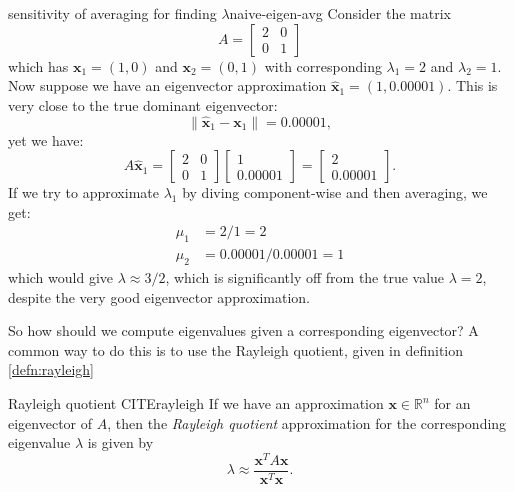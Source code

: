 \documentclass{article}
\let\vec\mathbf
\begin{document}
\begin{example}{sensitivity of averaging for finding $\lambda$}{naive-eigen-avg}
  Consider the matrix
  \begin{equation*}
    A = \begin{bmatrix}2 & 0 \\ 0 & 1\end{bmatrix}
  \end{equation*}
  which has $\vec{x}_1 = (1,0)$ and $\vec{x}_2 = (0,1)$ with corresponding $\lambda_1 = 2$ and $\lambda_2 = 1$. Now suppose we have an eigenvector approximation $\hat{\vec{x}}_1 = (1, 0.00001)$. This is very close to the true dominant eigenvector:
  \begin{equation*}
    \lVert \hat{\vec{x}}_1 - \vec{x}_1 \rVert = 0.00001,
  \end{equation*}
  yet we have:
  \begin{equation*}
    A\hat{\vec{x}}_1 = \begin{bmatrix}2 & 0 \\ 0 & 1\end{bmatrix}\begin{bmatrix}1 \\ 0.00001\end{bmatrix} = \begin{bmatrix}2 \\ 0.00001\end{bmatrix}.
  \end{equation*}
  If we try to approximate $\lambda_1$ by diving component-wise and then averaging, we get:
  \begin{align*}
    \mu_1 &= 2 / 1 = 2 \\
    \mu_2 &= 0.00001 / 0.00001 = 1
  \end{align*}
  which would give $\lambda \approx 3/2$, which is significantly off from the true value $\lambda = 2$, despite the very good eigenvector approximation.
\end{example}

So how should we compute eigenvalues given a corresponding eigenvector? A common way to do this is to use the Rayleigh quotient, given in definition \ref{defn:rayleigh}

\begin{definition}{Rayleigh quotient CITE}{rayleigh}
  If we have an approximation $\vec{x} \in \mathbb{R}^n$ for an eigenvector of $A$, then the \textit{Rayleigh quotient} approximation for the corresponding eigenvalue $\lambda$ is given by
  \begin{equation*}
    \lambda \approx \frac{\vec{x}^TA\vec{x}}{\vec{x}^T\vec{x}}.
  \end{equation*}
\end{definition}
\end{document}
